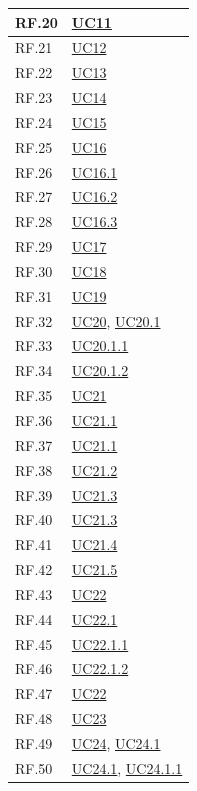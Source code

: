 \documentclass[12pt, a4paper]{article}
\begin{document}
\begin{longtable}{|l|p{}|}
RF.20 & \hyperref[uc:11]{UC11} \\ \hline
RF.21 & \hyperref[uc:12]{UC12} \\ \hline
RF.22 & \hyperref[uc:13]{UC13} \\ \hline
RF.23 & \hyperref[uc:14]{UC14} \\ \hline
RF.24 & \hyperref[uc:15]{UC15} \\ \hline
RF.25 & \hyperref[uc:16]{UC16} \\ \hline
RF.26 & \hyperref[uc:16.1]{UC16.1} \\ \hline
RF.27 & \hyperref[uc:16.2]{UC16.2} \\ \hline
RF.28 & \hyperref[uc:16.3]{UC16.3} \\ \hline
RF.29 & \hyperref[uc:17]{UC17} \\ \hline
RF.30 & \hyperref[uc:18]{UC18} \\ \hline
RF.31 & \hyperref[uc:19]{UC19} \\ \hline
RF.32 & \hyperref[uc:20]{UC20}, \hyperref[uc:20.1]{UC20.1} \\ \hline
RF.33 & \hyperref[uc:20.1.1]{UC20.1.1} \\ \hline
RF.34 & \hyperref[uc:20.1.2]{UC20.1.2} \\ \hline
RF.35 & \hyperref[uc:21]{UC21} \\ \hline
RF.36 & \hyperref[uc:21.1]{UC21.1} \\ \hline
RF.37 & \hyperref[uc:21.1]{UC21.1} \\ \hline
RF.38 & \hyperref[uc:21.2]{UC21.2} \\ \hline
RF.39 & \hyperref[uc:21.3]{UC21.3} \\ \hline
RF.40 & \hyperref[uc:21.3]{UC21.3} \\ \hline
RF.41 & \hyperref[uc:21.4]{UC21.4} \\ \hline
RF.42 & \hyperref[uc:21.5]{UC21.5} \\ \hline
RF.43 & \hyperref[uc:22]{UC22} \\ \hline
RF.44 & \hyperref[uc:22.1]{UC22.1} \\ \hline
RF.45 & \hyperref[uc:22.1.1]{UC22.1.1} \\ \hline
RF.46 & \hyperref[uc:22.1.2]{UC22.1.2} \\ \hline
RF.47 & \hyperref[uc:22]{UC22} \\ \hline
RF.48 & \hyperref[uc:23]{UC23} \\ \hline
RF.49 & \hyperref[uc:24]{UC24}, \hyperref[uc:24.1]{UC24.1} \\ \hline
RF.50 & \hyperref[uc:24.1]{UC24.1}, \hyperref[uc:24.1.1]{UC24.1.1} \\ \hline

\end{longtable}
\end{document}
